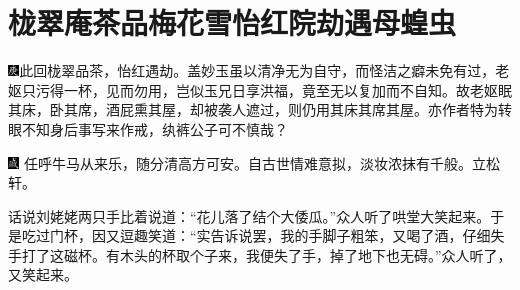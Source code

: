 

\chapter{栊翠庵茶品梅花雪\hspace{.5em}怡红院劫遇母蝗虫}

{\includegraphics[width=3mm]{../Images/00004}此回栊翠品茶，怡红遇劫。盖妙玉虽以清净无为自守，而怪洁之癖未免有过，老妪只污得一杯，见而勿用，岂似玉兄日享洪福，竟至无以复加而不自知。故老妪眠其床，卧其席，酒屁熏其屋，却被袭人遮过，则仍用其床其席其屋。亦作者特为转眼不知身后事写来作戒，纨裤公子可不慎哉？}

{\includegraphics[width=3mm]{../Images/00005} \kaishu 任呼牛马从来乐，随分清高方可安。自古世情难意拟，淡妆浓抹有千般。立松轩。}

话说刘姥姥两只手比着说道：``花儿落了结个大倭瓜。''众人听了哄堂大笑起来。于是吃过门杯，因又逗趣笑道：``实告诉说罢，我的手脚子粗笨，又喝了酒，仔细失手打了这磁杯。有木头的杯取个子来，我便失了手，掉了地下也无碍。''众人听了，又笑起来。

